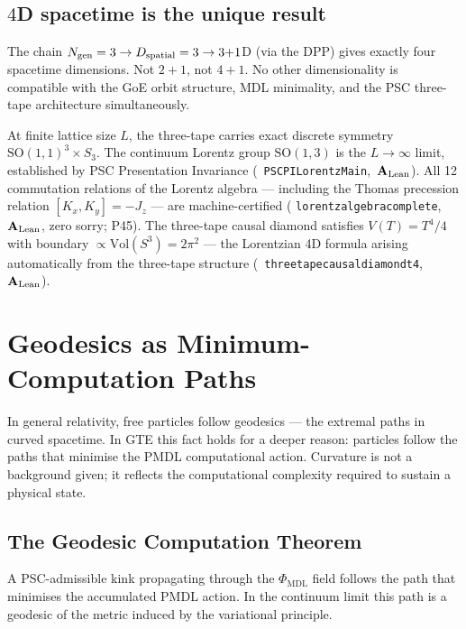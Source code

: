 \documentclass[11pt,openany]{book}
\theoremstyle{remark}
\newcommand{\PHIMDL}{\Phi_{\mathrm{MDL}}}
\newcommand{\lean}[1]{%
  \penalty-100
  \begingroup\def\_{\textunderscore\allowbreak}\texttt{#1}\endgroup}
\newcommand{\CMCA}{\text{CMCA}}
\newcommand{\CatAL}{\ensuremath{\textbf{A}_{\rm Lean}}}
\begin{document}
\subsection*{$4$D spacetime is the unique result}

The chain $N_{\rm gen} = 3 \to D_{\rm spatial} = 3 \to 3{+}1$D (via the DPP) gives
exactly four spacetime dimensions.
Not $2{+}1$, not $4{+}1$.
No other dimensionality is compatible with the GoE orbit structure, MDL minimality,
and the PSC three-tape architecture simultaneously.

At finite lattice size $L$, the three-tape \CMCA{} carries exact discrete symmetry
$\mathrm{SO}(1,1)^3 \times S_3$.
The continuum Lorentz group $\mathrm{SO}(1,3)$ is the $L\to\infty$ limit, established
by PSC Presentation Invariance \mbox{(\lean{PSCPILorentzMain}, \CatAL)}.
All 12 commutation relations of the Lorentz algebra --- including the Thomas precession
relation $[K_x, K_y] = -J_z$ --- are machine-certified
(\lean{lorentz\_algebra\_complete}, \CatAL, zero sorry; P45).
The three-tape causal diamond satisfies $V(T) = T^4/4$ with boundary
$\propto \mathrm{Vol}(S^3) = 2\pi^2$ --- the Lorentzian 4D formula arising automatically
from the three-tape structure \mbox{(\lean{three\_tape\_causal\_diamond\_t4}, \CatAL)}.

\section{Geodesics as Minimum-Computation Paths}
\label{sec:geodesics}

In general relativity, free particles follow geodesics --- the extremal paths in
curved spacetime.
In GTE this fact holds for a deeper reason: particles follow the paths that minimise
the PMDL computational action.
Curvature is not a background given; it reflects the computational complexity required
to sustain a physical state.

\subsection*{The Geodesic Computation Theorem}

A PSC-admissible kink propagating through the $\PHIMDL$ field follows the path that
minimises the accumulated PMDL action.
In the continuum limit this path is a geodesic of the metric induced by the variational
principle.
\end{document}
